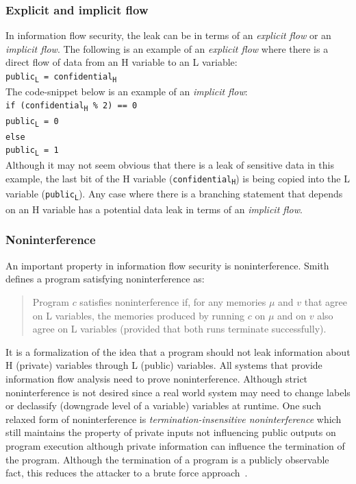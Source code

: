 \subsubsection{Explicit and implicit flow}
In information flow security, the leak can be in terms of an \textit{explicit flow}
or an \textit{implicit flow}. The following is an example of an \textit{explicit flow} where there is a direct
flow of data from an H variable to an L variable: \\
\indent
\texttt{public\textsubscript{L} = confidential\textsubscript{H}}
\eject
\noindent \\
The code-snippet below is an example of an \textit{implicit flow}: \\
\indent
	\texttt{if (confidential\textsubscript{H} \% 2)  == 0 \\ \indent \indent
		public\textsubscript{L} = 0 \\ \indent
	else \\ \indent \indent
		public\textsubscript{L} = 1} \\
\noindent Although it may not seem obvious that there is a leak of sensitive data
in this example, the last bit of the H variable (\texttt{confidential\textsubscript{H}})
is being copied into the L variable (\texttt{public\textsubscript{L}}). Any case
where there is a branching statement that depends on an H variable has a potential
data leak in terms of an \textit{implicit flow}.

\subsubsection{Noninterference \label{sec:noninterference}}
An important property in information flow security is noninterference. Smith~\cite{PrincInfoSec}
defines a program satisfying noninterference as:

\begin{quotation}
	\noindent Program $c$ satisfies noninterference if, for
	any memories $\mu$ and $v$ that agree on L variables, the memories produced by
	running $c$ on $\mu$ and on $v$ also agree on L variables (provided that both runs
	terminate successfully).
\end{quotation}
It is a formalization of the idea that a program should not leak
information about H (private) variables through L (public) variables. All systems
that provide information flow analysis need to prove noninterference. Although
strict noninterference is not desired since a real world system may need to change
labels or declassify (downgrade level of a variable) variables at runtime. One such
relaxed form of noninterference is \textit{termination-insensitive noninterference}
which still maintains the property of private inputs not influencing public outputs
on program execution although private information can influence the termination of
the program. Although the termination of a program is a publicly observable fact,
this reduces the attacker to a brute force approach~\cite{TINI}.

